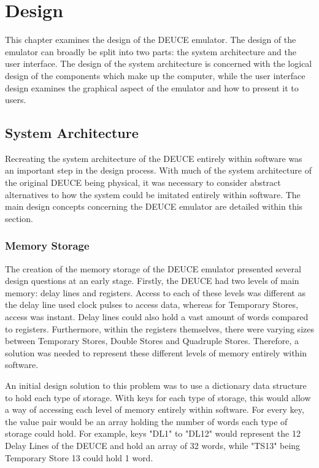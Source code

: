 \documentclass{l4proj}
\begin{document}
\chapter{Design}
This chapter examines the design of the DEUCE emulator. The design of the emulator can broadly be split into two parts: the system architecture and the user interface. The design of the system architecture is concerned with the logical design of the components which make up the computer, while the user interface design examines the graphical aspect of the emulator and how to present it to users.
\section{System Architecture}
Recreating the system architecture of the DEUCE entirely within software was an important step in the design process. With much of the system architecture of the original DEUCE being physical, it was necessary to consider abstract alternatives to how the system could be imitated entirely within software. The main design concepts concerning the DEUCE emulator are detailed within this section.

\subsection{Memory Storage}
The creation of the memory storage of the DEUCE emulator presented several design questions at an early stage. Firstly, the DEUCE had two levels of main memory: delay lines and registers. Access to each of these levels was different as the delay line used clock pulses to access data, whereas for Temporary Stores, access was instant. Delay lines could also hold a vast amount of words compared to registers. Furthermore, within the registers themselves, there were varying sizes between Temporary Stores, Double Stores and Quadruple Stores. Therefore, a solution was needed to represent these different levels of memory entirely within software.

An initial design solution to this problem was to use a dictionary data structure to hold each type of storage. With keys for each type of storage, this would allow a way of accessing each level of memory entirely within software. For every key, the value pair would be an array holding the number of words each type of storage could hold. For example, keys "DL1" to "DL12" would represent the 12 Delay Lines of the DEUCE and hold an array of 32 words, while "TS13" being Temporary Store 13 could hold 1 word.
\end{document}
